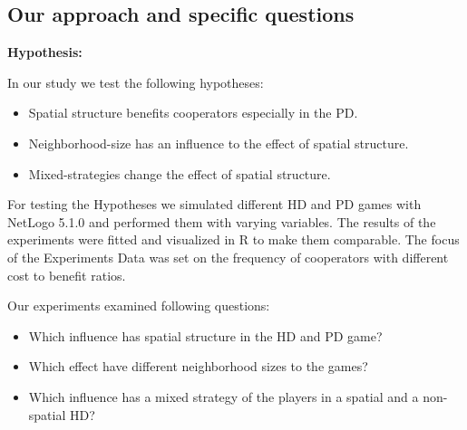 \subsection{Our approach and specific questions}
\textbf{Hypothesis:}

In our study we test the following hypotheses: 

\begin{itemize}
\item Spatial structure benefits cooperators especially in the PD.
\item Neighborhood-size has an influence to the effect of spatial structure.
\item Mixed-strategies change the effect of spatial structure.
\end{itemize}

For testing the Hypotheses we simulated different HD and PD games with NetLogo 5.1.0 \citep{Wilensky1999} and performed them with varying variables. The results of the experiments were fitted and visualized in R \citep{R} to make them comparable. The focus of the Experiments Data was set on the frequency of cooperators with different cost to benefit ratios.

Our experiments examined following questions:
\begin{itemize}
\item Which influence has spatial structure in the HD and PD game?
\item Which effect have different neighborhood sizes to the games?
\item Which influence has a mixed strategy of the players in a spatial and a non-spatial HD?
\end{itemize}
